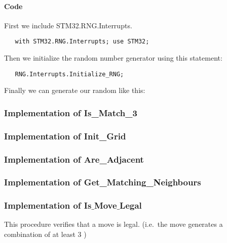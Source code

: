 \paragraph{Code}

\noindent
First we include STM32.RNG.Interrupts.
\begin{lstlisting}
   with STM32.RNG.Interrupts; use STM32;
\end{lstlisting}


\noindent
Then we initialize the random number generator using this statement:
\begin{lstlisting}
   RNG.Interrupts.Initialize_RNG;
\end{lstlisting}


\noindent
Finally we can generate our random \sqs like this:


\subsubsection{Implementation of Is\_Match\_3}


\subsubsection{Implementation of Init\_Grid}


\subsubsection{Implementation of Are\_Adjacent}


\subsubsection{Implementation of Get\_Matching\_Neighbours}


\subsubsection{Implementation of Is$\_$Move$\_$Legal}

This procedure verifies that a move is legal. (i.e.\  the move generates a combination of at least 3 \sqs)

